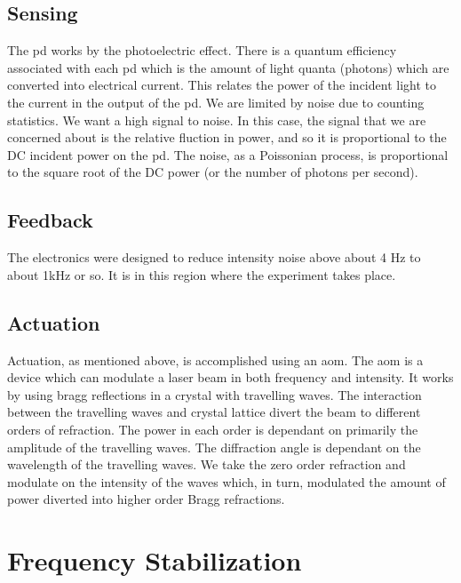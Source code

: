 \subsection{Sensing}

The \ac{pd} works by the photoelectric effect. There is a quantum
efficiency associated with each \ac{pd} which is the amount of light quanta
(photons) which are converted into electrical current. This relates the
power of the incident light to the current in the output of the \ac{pd}.
We are limited by noise due to counting statistics. We want a high signal
to noise. In this case, the signal that we are concerned about is the
relative fluction in power, and so it is proportional to the DC incident
power on the \ac{pd}. The noise, as a Poissonian process, is proportional
to the square root of the DC power (or the number of photons per second).

\subsection{Feedback}

The electronics were designed to reduce intensity noise above about 4 Hz to
about 1kHz or so. It is in this region where the experiment takes place.

\subsection{Actuation}

Actuation, as mentioned above, is accomplished using an \ac{aom}. The
\ac{aom} is a device which can modulate a laser beam in both frequency
and intensity. It works by using bragg reflections in a crystal with
travelling waves. The interaction between the travelling waves and crystal
lattice divert the beam to different orders of refraction. The power in each
order is dependant on primarily the amplitude of the travelling waves. The
diffraction angle is dependant on the wavelength of the travelling waves.
We take the zero order refraction and modulate on the intensity of the
waves which, in turn, modulated the amount of power diverted into higher order
Bragg refractions.

\section{Frequency Stabilization}

